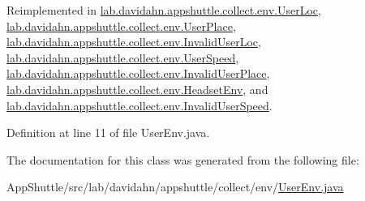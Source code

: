\-Reimplemented in \hyperlink{classlab_1_1davidahn_1_1appshuttle_1_1collect_1_1env_1_1_user_loc_a6ed270496491ed719da528de0ae7f72f}{lab.\-davidahn.\-appshuttle.\-collect.\-env.\-User\-Loc}, \hyperlink{classlab_1_1davidahn_1_1appshuttle_1_1collect_1_1env_1_1_user_place_a9ce9d44fc084c9506c8c9e6382c6b204}{lab.\-davidahn.\-appshuttle.\-collect.\-env.\-User\-Place}, \hyperlink{classlab_1_1davidahn_1_1appshuttle_1_1collect_1_1env_1_1_invalid_user_loc_a414034f6dd12db4193675a9c742c7de3}{lab.\-davidahn.\-appshuttle.\-collect.\-env.\-Invalid\-User\-Loc}, \hyperlink{classlab_1_1davidahn_1_1appshuttle_1_1collect_1_1env_1_1_user_speed_a64815731d5fdff97bcb0eceda4afbf1b}{lab.\-davidahn.\-appshuttle.\-collect.\-env.\-User\-Speed}, \hyperlink{classlab_1_1davidahn_1_1appshuttle_1_1collect_1_1env_1_1_invalid_user_place_aed7adbe3f2999285daadf13a60db8863}{lab.\-davidahn.\-appshuttle.\-collect.\-env.\-Invalid\-User\-Place}, \hyperlink{classlab_1_1davidahn_1_1appshuttle_1_1collect_1_1env_1_1_headset_env_ad81bc791a832fb2051d7569326de6679}{lab.\-davidahn.\-appshuttle.\-collect.\-env.\-Headset\-Env}, and \hyperlink{classlab_1_1davidahn_1_1appshuttle_1_1collect_1_1env_1_1_invalid_user_speed_a94a9655c9630dfc6c75536fa49cddf94}{lab.\-davidahn.\-appshuttle.\-collect.\-env.\-Invalid\-User\-Speed}.



\-Definition at line 11 of file \-User\-Env.\-java.



\-The documentation for this class was generated from the following file\-:\begin{DoxyCompactItemize}
\item 
\-App\-Shuttle/src/lab/davidahn/appshuttle/collect/env/\hyperlink{_user_env_8java}{\-User\-Env.\-java}\end{DoxyCompactItemize}
